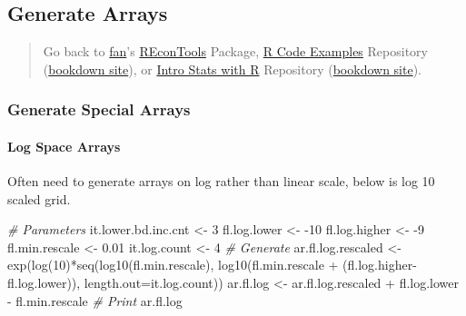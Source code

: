 \documentclass[
]{book}
\newenvironment{Shaded}{\begin{snugshade}}{\end{snugshade}}
\newcommand{\AttributeTok}[1]{\textcolor[rgb]{0.77,0.63,0.00}{#1}}
\newcommand{\CommentTok}[1]{\textcolor[rgb]{0.56,0.35,0.01}{\textit{#1}}}
\newcommand{\DecValTok}[1]{\textcolor[rgb]{0.00,0.00,0.81}{#1}}
\newcommand{\FloatTok}[1]{\textcolor[rgb]{0.00,0.00,0.81}{#1}}
\newcommand{\FunctionTok}[1]{\textcolor[rgb]{0.00,0.00,0.00}{#1}}
\newcommand{\NormalTok}[1]{#1}
\newcommand{\OtherTok}[1]{\textcolor[rgb]{0.56,0.35,0.01}{#1}}
\newcommand{\SpecialCharTok}[1]{\textcolor[rgb]{0.00,0.00,0.00}{#1}}
\begin{document}
\hypertarget{generate-arrays}{%
\subsection{Generate Arrays}\label{generate-arrays}}

\begin{quote}
Go back to \href{http://fanwangecon.github.io/}{fan}'s \href{https://fanwangecon.github.io/REconTools/}{REconTools} Package, \href{https://fanwangecon.github.io/R4Econ/}{R Code Examples} Repository (\href{https://fanwangecon.github.io/R4Econ/bookdown}{bookdown site}), or \href{https://fanwangecon.github.io/Stat4Econ/}{Intro Stats with R} Repository (\href{https://fanwangecon.github.io/Stat4Econ/bookdown}{bookdown site}).
\end{quote}

\hypertarget{generate-special-arrays}{%
\subsubsection{Generate Special Arrays}\label{generate-special-arrays}}

\hypertarget{log-space-arrays}{%
\paragraph{Log Space Arrays}\label{log-space-arrays}}

Often need to generate arrays on log rather than linear scale, below is log 10 scaled grid.

\begin{Shaded}
\begin{Highlighting}[]
\CommentTok{\# Parameters}
\NormalTok{it.lower.bd.inc.cnt }\OtherTok{\textless{}{-}} \DecValTok{3}
\NormalTok{fl.log.lower }\OtherTok{\textless{}{-}} \SpecialCharTok{{-}}\DecValTok{10}
\NormalTok{fl.log.higher }\OtherTok{\textless{}{-}} \SpecialCharTok{{-}}\DecValTok{9}
\NormalTok{fl.min.rescale }\OtherTok{\textless{}{-}} \FloatTok{0.01}
\NormalTok{it.log.count }\OtherTok{\textless{}{-}} \DecValTok{4}
\CommentTok{\# Generate}
\NormalTok{ar.fl.log.rescaled }\OtherTok{\textless{}{-}} \FunctionTok{exp}\NormalTok{(}\FunctionTok{log}\NormalTok{(}\DecValTok{10}\NormalTok{)}\SpecialCharTok{*}\FunctionTok{seq}\NormalTok{(}\FunctionTok{log10}\NormalTok{(fl.min.rescale),}
                                      \FunctionTok{log10}\NormalTok{(fl.min.rescale }\SpecialCharTok{+}
\NormalTok{                                              (fl.log.higher}\SpecialCharTok{{-}}\NormalTok{fl.log.lower)),}
                                      \AttributeTok{length.out=}\NormalTok{it.log.count))}
\NormalTok{ar.fl.log }\OtherTok{\textless{}{-}}\NormalTok{ ar.fl.log.rescaled }\SpecialCharTok{+}\NormalTok{ fl.log.lower }\SpecialCharTok{{-}}\NormalTok{ fl.min.rescale}
\CommentTok{\# Print}
\NormalTok{ar.fl.log}
\end{Highlighting}
\end{Shaded}
\end{document}
